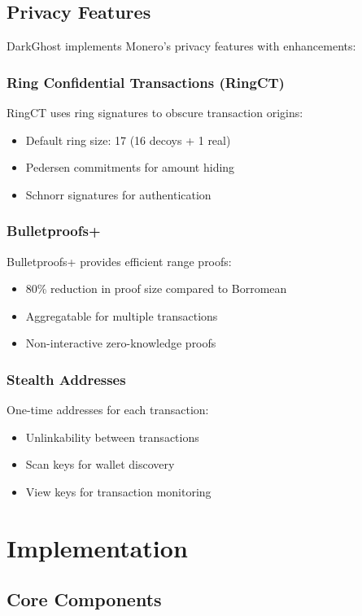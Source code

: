 \documentclass[11pt]{article}
\begin{document}
\subsection{Privacy Features}
DarkGhost implements Monero's privacy features with enhancements:

\subsubsection{Ring Confidential Transactions (RingCT)}
RingCT uses ring signatures to obscure transaction origins:
\begin{itemize}
    \item Default ring size: 17 (16 decoys + 1 real)
    \item Pedersen commitments for amount hiding
    \item Schnorr signatures for authentication
\end{itemize}

\subsubsection{Bulletproofs+}
Bulletproofs+ provides efficient range proofs:
\begin{itemize}
    \item 80\% reduction in proof size compared to Borromean
    \item Aggregatable for multiple transactions
    \item Non-interactive zero-knowledge proofs
\end{itemize}

\subsubsection{Stealth Addresses}
One-time addresses for each transaction:
\begin{itemize}
    \item Unlinkability between transactions
    \item Scan keys for wallet discovery
    \item View keys for transaction monitoring
\end{itemize}

\section{Implementation}
\subsection{Core Components}
\end{document}
